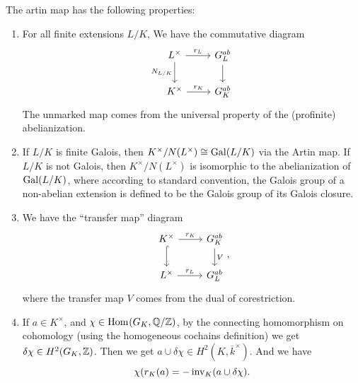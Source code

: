 \begin{theorem}
	The artin map has the following properties:
	\begin{enumerate}[(1)]
		\item For all finite extensions \(L / K\),
			We have the commutative diagram
			\[
			\begin{tikzcd}
			L^{\times} \arrow{r}{r_{L}} \arrow{d}[swap]{N_{L / K}} &
			\absgal{L}^{ab} \arrow{d}{} \\
			K^{\times} \arrow{r}{r_{K}} &
			\gk^{ab}
			\end{tikzcd}
			\]
			The unmarked map comes from the
			universal property of the (profinite) abelianization.
		\item 	
			If \(L / K\) is finite Galois, then 
			\(K^{\times} / N(L^{\times}) \cong \operatorname{Gal}(L / K)\)
			via the Artin map.
			If \(L / K\) is not Galois, then 
			\(K^{\times} / N(L^{\times})\) is isomorphic
			to the abelianization of \(\operatorname{Gal}(L / K)\),
			where according to standard convention,
			the Galois group of a non-abelian extension
			is defined to be the Galois group of its 
			Galois closure.
		\item 
			We have the ``transfer map'' diagram
			\[
			\begin{tikzcd}
				K^{\times} \arrow{r}{r_{K}} 
				\arrow[hookrightarrow]{d}{} &
			\gk^{ab} \arrow{d}{V} \\
			L^{\times} \arrow{r}{r_{L}} &
			\absgal{L}^{ab}
			\end{tikzcd}
			,\]
			where the transfer map \(V\) comes from 
			the dual of corestriction.
		\item
			If \(a \in K^{\times}\), and 
			\(\chi \in \operatorname{Hom}_{} (G_{K},\mathbb{Q} / \mathbb{Z})\),
			by the connecting homomorphism on cohomology
			(using the homogeneous cochains definition)
			we get \(\delta\chi \in H^{2}(G_{K}, \mathbb{Z})\).
			Then we get 
			\(a \cup \delta \chi \in H^{2}(K,\overline{k}^{\times})\).
			And we have
			\[
				\chi(r_{K}(a) = - \operatorname{inv}_{K}(a \cup \delta\chi)
			.\] 
	\end{enumerate}
\end{theorem}


